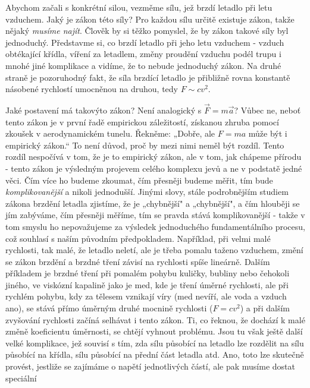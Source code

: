     Abychom začali s konkrétní silou, vezměme sílu, jež brzdí letadlo při letu vzduchem. Jaký je 
    zákon této síly? Pro každou sílu určitě existuje zákon, takže nějaký \emph{musíme najít}. 
    Člověk by si těžko pomyslel, že by zákon takové síly byl jednoduchý. Představme si, co brzdí 
    letadlo při jeho letu  vzduchem - vzduch obtékající křídla, víření za letadlem, změny proudění 
    vzduchu podél trupu i mnohé jiné komplikace a vidíme, že to nebude jednoduchý zákon. Na druhé 
    straně je pozoruhodný fakt, že síla brzdící letadlo je přibližně rovna konstantě násobené 
    rychlostí umocněnou na druhou, tedy \(F\sim cv^2\).
    
    Jaké postavení má takovýto zákon? Není analogický s \(\vec{F}= m\vec{a}\)? Vůbec ne, neboť 
    tento zákon je v první řadě empirickou záležitostí, získanou zhruba pomocí zkoušek v 
    aerodynamickém tunelu. Řekněme: „Dobře, ale \(F=ma\) může být i empirický zákon.“ To není 
    důvod, proč by mezi nimi neměl být rozdíl. Tento rozdíl nespočívá v tom, že je to empirický 
    zákon, ale v tom, jak chápeme přírodu - tento zákon je výsledným projevem celého komplexu jevů 
    a ne v podstatě jedné věci. Čím více ho budeme zkoumat, čím přesněji budeme měřit, tím bude 
    \emph{komplikovanější} a nikoli jednodušší. Jinými slovy, stále podrobnějším studiem zákona 
    brzdění letadla zjistíme, že je „chybnější" a „chybnější", a čím hlouběji se jím zabýváme, čím 
    přesněji měříme, tím se pravda stává komplikovanější - takže v tom smyslu ho nepovažujeme za 
    výsledek jednoduchého fundamentálního procesu, což souhlasí s naším původním předpokladem. 
    Například, při velmi malé rychlosti, tak malé, že letadlo neletí, ale je třeba pomalu taženo 
    vzduchem, změní se zákon brzdění a brzdné tření závisí na rychlosti spíše lineárně. Dalším 
    příkladem je brzdné tření při pomalém pohybu kuličky, bubliny nebo čehokoli jiného, ve viskózní 
    kapalině jako je med, kde je tření úměrné rychlosti, ale při rychlém pohybu, kdy za tělesem 
    vznikají víry (med nevíří, ale voda a vzduch ano), se stává přímo úměrným druhé mocnině 
    rychlosti (\(F=cv^2\)) a při dalším zvyšování rychlosti začíná selhávat i tento zákon. Ti, co 
    řeknou, že dochází k malé změně koeficientu úměrnosti, se chtějí vyhnout problému. Jsou tu však 
    ještě další velké komplikace, jež souvisí s tím, zda sílu působící na letadlo lze rozdělit na 
    sílu působící na křídla, sílu působící na přední část letadla atd. Ano, toto lze skutečně 
    provést, jestliže se zajímáme o napětí jednotlivých částí, ale pak musíme dostat speciální 
